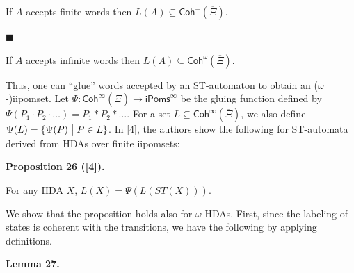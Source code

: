 \documentclass[10pt,a4paper]{article}
\begin{document}
If $A$ accepts finite words then $L(A)\subseteq\mathsf{Coh}^{+}(\overline{\Xi})$.\par
 
 
 
\par\noindent  $\blacksquare$ 
 
If $A$ accepts infinite words then $L(A)\subseteq\mathsf{Coh}^{\omega}(\overline{\Xi})$.\par
 
 
  
 
 
 
Thus, one can “glue” words accepted by an ST-automaton to obtain an ($\omega$-)iipomset. Let $\Psi\colon\mathsf{Coh}^{\infty}(\overline{\Xi})\to{\mathsf{iPoms}^{\infty}}$ be the gluing function defined by $\Psi(P_{1}\cdot P_{2}\cdot\dots)=P_{1}*P_{2}*\dots$. For a set $L\subseteq\mathsf{Coh}^{\infty}(\overline{\Xi})$, we also define $\Psi(L)={\{\Psi(P)\mathrel{\big{|}}P\in L\}}$. In [4], the authors show the following for ST-automata derived from HDAs over finite iipomsets:\par
 
 
 
\par\medskip\noindent\textbf{Proposition 26 ([4]).}\par
 
 
For any HDA $X$, $L(X)=\Psi(L(ST(X)))$.\par
 
 
 
 
We show that the proposition holds also for $\omega$-HDAs. First, since the labeling of states is coherent with the transitions, we have the following by applying definitions.\par
 
 
 
\par\medskip\noindent\textbf{Lemma 27.}\par
 
 
\end{document}
